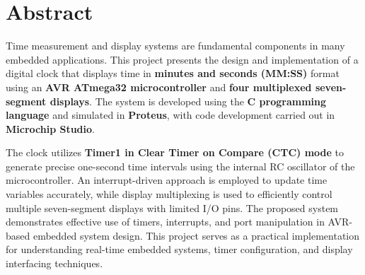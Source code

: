 \chapter*{Abstract}

Time measurement and display systems are fundamental components in many embedded applications. 
This project presents the design and implementation of a digital clock that displays time in 
\textbf{minutes and seconds (MM:SS)} format using an \textbf{AVR ATmega32 microcontroller} and 
\textbf{four multiplexed seven-segment displays}. The system is developed using the 
\textbf{C programming language} and simulated in \textbf{Proteus}, with code development carried 
out in \textbf{Microchip Studio}.

The clock utilizes \textbf{Timer1 in Clear Timer on Compare 
(CTC) mode} to generate precise 
one-second time intervals using the internal RC 
oscillator of the microcontroller. An 
interrupt-driven approach is employed to update time variables accurately, while display 
multiplexing is used to efficiently control multiple seven-segment displays with limited 
I/O 
pins. The proposed system demonstrates effective use of timers, interrupts, and port manipulation 
in AVR-based embedded system design. 
This project serves as a practical implementation for 
understanding real-time embedded systems, timer configuration, and display interfacing 
techniques.

